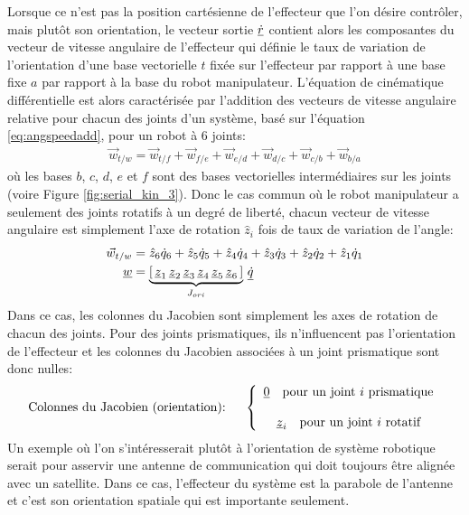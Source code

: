 Lorsque ce n'est pas la position cartésienne de l'effecteur que l'on désire contrôler, mais plutôt son orientation, le vecteur sortie $\underline{\dot{r}}$ contient alors les composantes du vecteur de vitesse angulaire de l'effecteur qui définie le taux de variation de l'orientation d'une base vectorielle $t$ fixée sur l'effecteur par rapport à une base fixe $a$ par rapport à la base du robot manipulateur. L'équation de cinématique différentielle est alors caractérisée par l'addition des vecteurs de vitesse angulaire relative pour chacun des joints d'un système, basé sur l'équation \eqref{eq:angspeedadd}, pour un robot à 6 joints:
\begin{align}
	\vec{w}_{t/w} = \vec{w}_{t/f} + \vec{w}_{f/e} + \vec{w}_{e/d} + \vec{w}_{d/c} + \vec{w}_{c/b} + \vec{w}_{b/a}
\end{align}
où les bases $b$, $c$, $d$, $e$ et $f$ sont des bases vectorielles intermédiaires sur les joints (voire Figure \ref{fig:serial_kin_3}).
Donc le cas commun où le robot manipulateur a seulement des joints rotatifs à un degré de liberté, chacun vecteur de vitesse angulaire est simplement l'axe de rotation $\hat{z}_i$ fois de taux de variation de l'angle:
\begin{align}
	\vec{w}_{t/w} &= \hat{z}_6 \dot{q}_6 +  \hat{z}_5 \dot{q}_5 +  \hat{z}_4 \dot{q}_4 +  \hat{z}_3 \dot{q}_3 +  \hat{z}_2 \dot{q}_2 +  \hat{z}_1 \dot{q}_1 \\
	\underline{w} &=
	\underbrace{
		\left[ \, \underline{z}_1 \, \underline{z}_2 \, \underline{z}_3 \, \underline{z}_4 \, \underline{z}_5 \, \underline{z}_6 \, \right]
	}_{J_{ori}}
	\, \underline{\dot{q}}
\end{align}
Dans ce cas, les colonnes du Jacobien sont simplement les axes de rotation de chacun des joints. Pour des joints prismatiques, ils n'influencent pas l'orientation de l'effecteur et les colonnes du Jacobien associées à un joint prismatique sont donc nulles:
\begin{equation}
	\text{Colonnes du Jacobien (orientation): } \quad\left\{ \begin{array}{c}
																 \underline{0} \quad \text{pour un joint $i$ prismatique}
																 \\ \\
																 \underline{z}_i \quad \text{pour un joint $i$ rotatif}
	\end{array}
	\right.
\end{equation}
%
Un exemple où l'on s'intéresserait plutôt à l'orientation de système robotique serait pour asservir une antenne de communication qui doit toujours être alignée avec un satellite. Dans ce cas, l'effecteur du système est la parabole de l'antenne et c'est son orientation spatiale qui est importante seulement.

